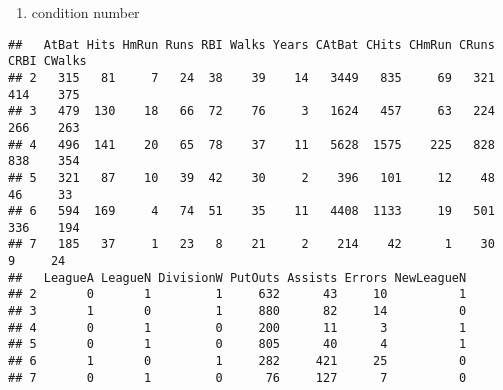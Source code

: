 \documentclass[
]{article}
\newenvironment{Shaded}{\begin{snugshade}}{\end{snugshade}}
\newcommand{\AttributeTok}[1]{\textcolor[rgb]{0.13,0.29,0.53}{#1}}
\newcommand{\CommentTok}[1]{\textcolor[rgb]{0.56,0.35,0.01}{\textit{#1}}}
\newcommand{\DecValTok}[1]{\textcolor[rgb]{0.00,0.00,0.81}{#1}}
\newcommand{\FunctionTok}[1]{\textcolor[rgb]{0.13,0.29,0.53}{\textbf{#1}}}
\newcommand{\NormalTok}[1]{#1}
\newcommand{\OtherTok}[1]{\textcolor[rgb]{0.56,0.35,0.01}{#1}}
\newcommand{\SpecialCharTok}[1]{\textcolor[rgb]{0.81,0.36,0.00}{\textbf{#1}}}
\providecommand{\tightlist}{%
  \setlength{\itemsep}{0pt}\setlength{\parskip}{0pt}}
\begin{document}
\begin{enumerate}
\def\labelenumi{\alph{enumi}.}
\setcounter{enumi}{1}
\tightlist
\item
  condition number
\end{enumerate}

\begin{Shaded}
\end{Shaded}

\begin{verbatim}
##   AtBat Hits HmRun Runs RBI Walks Years CAtBat CHits CHmRun CRuns CRBI CWalks
## 2   315   81     7   24  38    39    14   3449   835     69   321  414    375
## 3   479  130    18   66  72    76     3   1624   457     63   224  266    263
## 4   496  141    20   65  78    37    11   5628  1575    225   828  838    354
## 5   321   87    10   39  42    30     2    396   101     12    48   46     33
## 6   594  169     4   74  51    35    11   4408  1133     19   501  336    194
## 7   185   37     1   23   8    21     2    214    42      1    30    9     24
##   LeagueA LeagueN DivisionW PutOuts Assists Errors NewLeagueN
## 2       0       1         1     632      43     10          1
## 3       1       0         1     880      82     14          0
## 4       0       1         0     200      11      3          1
## 5       0       1         0     805      40      4          1
## 6       1       0         1     282     421     25          0
## 7       0       1         0      76     127      7          0
\end{verbatim}

\begin{Shaded}
\end{Shaded}
\end{document}
